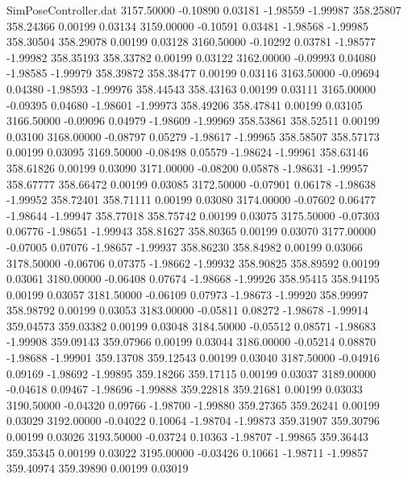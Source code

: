 \begin{filecontents}{SimPoseController.dat}
3157.50000   -0.10890    0.03181    -1.98559   -1.99987  358.25807  358.24366    0.00199    0.03134
3159.00000   -0.10591    0.03481    -1.98568   -1.99985  358.30504  358.29078    0.00199    0.03128
3160.50000   -0.10292    0.03781    -1.98577   -1.99982  358.35193  358.33782    0.00199    0.03122
3162.00000   -0.09993    0.04080    -1.98585   -1.99979  358.39872  358.38477    0.00199    0.03116
3163.50000   -0.09694    0.04380    -1.98593   -1.99976  358.44543  358.43163    0.00199    0.03111
3165.00000   -0.09395    0.04680    -1.98601   -1.99973  358.49206  358.47841    0.00199    0.03105
3166.50000   -0.09096    0.04979    -1.98609   -1.99969  358.53861  358.52511    0.00199    0.03100
3168.00000   -0.08797    0.05279    -1.98617   -1.99965  358.58507  358.57173    0.00199    0.03095
3169.50000   -0.08498    0.05579    -1.98624   -1.99961  358.63146  358.61826    0.00199    0.03090
3171.00000   -0.08200    0.05878    -1.98631   -1.99957  358.67777  358.66472    0.00199    0.03085
3172.50000   -0.07901    0.06178    -1.98638   -1.99952  358.72401  358.71111    0.00199    0.03080
3174.00000   -0.07602    0.06477    -1.98644   -1.99947  358.77018  358.75742    0.00199    0.03075
3175.50000   -0.07303    0.06776    -1.98651   -1.99943  358.81627  358.80365    0.00199    0.03070
3177.00000   -0.07005    0.07076    -1.98657   -1.99937  358.86230  358.84982    0.00199    0.03066
3178.50000   -0.06706    0.07375    -1.98662   -1.99932  358.90825  358.89592    0.00199    0.03061
3180.00000   -0.06408    0.07674    -1.98668   -1.99926  358.95415  358.94195    0.00199    0.03057
3181.50000   -0.06109    0.07973    -1.98673   -1.99920  358.99997  358.98792    0.00199    0.03053
3183.00000   -0.05811    0.08272    -1.98678   -1.99914  359.04573  359.03382    0.00199    0.03048
3184.50000   -0.05512    0.08571    -1.98683   -1.99908  359.09143  359.07966    0.00199    0.03044
3186.00000   -0.05214    0.08870    -1.98688   -1.99901  359.13708  359.12543    0.00199    0.03040
3187.50000   -0.04916    0.09169    -1.98692   -1.99895  359.18266  359.17115    0.00199    0.03037
3189.00000   -0.04618    0.09467    -1.98696   -1.99888  359.22818  359.21681    0.00199    0.03033
3190.50000   -0.04320    0.09766    -1.98700   -1.99880  359.27365  359.26241    0.00199    0.03029
3192.00000   -0.04022    0.10064    -1.98704   -1.99873  359.31907  359.30796    0.00199    0.03026
3193.50000   -0.03724    0.10363    -1.98707   -1.99865  359.36443  359.35345    0.00199    0.03022
3195.00000   -0.03426    0.10661    -1.98711   -1.99857  359.40974  359.39890    0.00199    0.03019

\end{filecontents}
